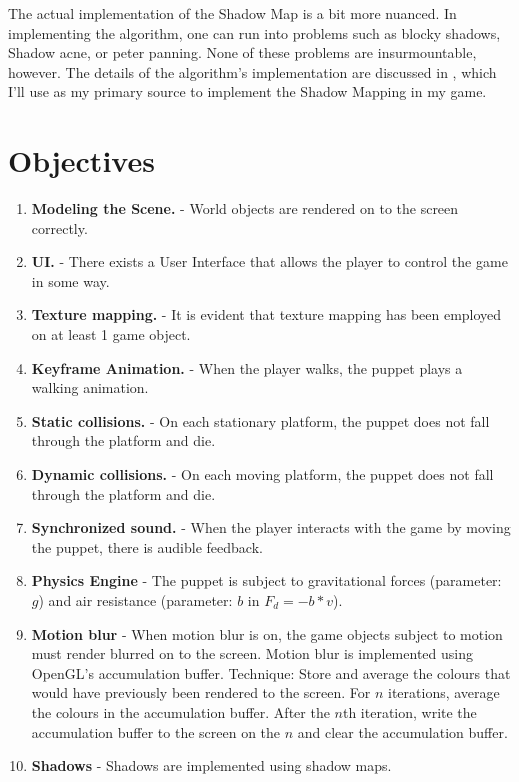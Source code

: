 \documentclass[11pt]{article}
\begin{document}
The actual implementation of the Shadow Map is a bit more nuanced. In implementing the algorithm, one can run into problems such as blocky shadows, Shadow acne, or peter panning. None of these problems are insurmountable, however. The details of the algorithm's implementation are discussed in \cite{shadow-map-learn-opengl}, which I'll use as my primary source to implement the Shadow Mapping in my game.

\printbibliography
\section{Objectives}
\begin{enumerate}
\item \textbf{Modeling the Scene.} - World objects are rendered on to the screen correctly.
\item \textbf{UI.} - There exists a User Interface that allows the player to control the game in some way.
\item \textbf{Texture mapping.} - It is evident that texture mapping has been employed on at least 1 game object.
\item \textbf{Keyframe Animation.} - When the player walks, the puppet plays a walking animation.
\item \textbf{Static collisions.} - On each stationary platform, the puppet does not fall through the platform and die.
\item \textbf{Dynamic collisions.} - On each moving platform, the puppet does not fall through the platform and die.
\item \textbf{Synchronized sound.} - When the player interacts with the game by moving the puppet, there is audible feedback. 
\item \textbf{Physics Engine} - The puppet is subject to gravitational forces (parameter: $g$) and air resistance (parameter: $b$ in $F_d = -b * v$). 
\item \textbf{Motion blur} - When motion blur is on, the game objects subject to motion must render blurred on to the screen. Motion blur is implemented using OpenGL's accumulation buffer. Technique: Store and average the colours that would have previously been rendered to the screen. For $n$ iterations, average the colours in the accumulation buffer. After the $n$th iteration, write the accumulation buffer to the screen on the $n$ and clear the accumulation buffer.
\item \textbf{Shadows} - Shadows are implemented using shadow maps.
\end{enumerate}
\end{document}
